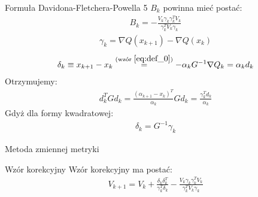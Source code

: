   \begin{frame}{Formuła Davidona-Fletchera-Powella 5}
    $B_k$ powinna mieć postać:
    \begin{equation*}
      \begin{aligned}
        B_k = - \frac{V_k \gamma_k \gamma_k^T V_k}{\gamma_k^T V_k \gamma_k}
      \end{aligned}
    \end{equation*}
    \begin{equation}
      \begin{aligned}
        \gamma_k = \nabla Q(x_{k + 1}) - \nabla Q(x_k)
      \end{aligned}
    \end{equation}
    \begin{equation}
      \begin{aligned}
        \delta_k \equiv x_{k + 1} - x_k \stackrel{(\text{wzór } \ref{eq:def_0})}{=} -\alpha_k G^{-1} \nabla Q_k = \alpha_k d_k
      \end{aligned}
    \end{equation}
    Otrzymujemy:
    \begin{equation*}
      \begin{aligned}
        d_k^T G d_k = \frac{(\alpha_{k + 1} - x_k)^T}{\alpha_k} G d_k = \frac{\gamma_k^T d_k}{\alpha_k}
      \end{aligned}
    \end{equation*}
    Gdyż dla formy kwadratowej:
    \begin{equation}
      \begin{aligned}
        \delta_k = G^{-1} \gamma_k
      \end{aligned}
    \end{equation}
  \end{frame}

  \begin{frame}{Metoda zmiennej metryki}
    \begin{block}{Wzór korekcyjny}
        Wzór korekcyjny ma postać:
        \begin{equation*}
          \begin{aligned}
            V_{k + 1} = V_k + \frac{\delta_k \delta_k^T}{\gamma_k^T \delta_k} - \frac{V_k \gamma_k \gamma_k^T  V_k}{\gamma_k^T  V_k \gamma_k}
          \end{aligned}
        \end{equation*}
    \end{block}
  \end{frame}

